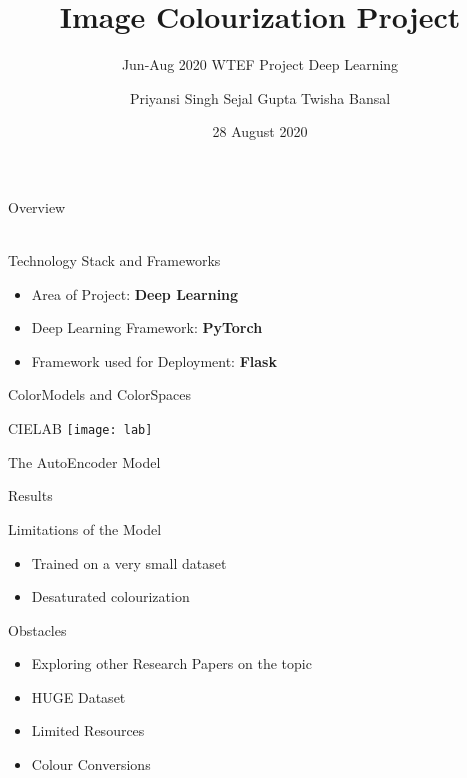 \documentclass[12pt]{beamer}
\title[Image-Colourization]{Image Colourization Project}
\subtitle{Jun-Aug 2020 {\textbar} WTEF Project {\textbar} Deep Learning}
\author[Team-9]{Priyansi Singh {\textbar} Sejal Gupta {\textbar} Twisha Bansal}
\date{28 August 2020}
\begin{document}
\begin{frame}
        \titlepage
\end{frame}

\begin{frame}{Overview}
	\\~
\end{frame}

\begin{frame}{Technology Stack and Frameworks}
	\begin{itemize}
		\item Area of Project: \textbf{Deep Learning}
			\pause
		\item Deep Learning Framework: \textbf{PyTorch}
			\pause
		\item Framework used for Deployment: \textbf{Flask}
	\end{itemize}
\end{frame}

\begin{frame}[standout]
		\pause
\end{frame}

\begin{frame}{ColorModels and ColorSpaces}
\end{frame}

\begin{frame}{CIELAB}
	\texttt{[image: lab]}
\end{frame}

\begin{frame}{The AutoEncoder Model}
\end{frame}

\begin{frame}{Results}
\end{frame}

\begin{frame}{Limitations of the Model}
	\begin{itemize}
		\item Trained on a very small dataset
			\pause
		\item Desaturated colourization
	\end{itemize}
\end{frame}

\begin{frame}{Obstacles}
	\begin{itemize}
		\item Exploring other Research Papers on the topic
			\pause
		\item HUGE Dataset
			\pause
		\item Limited Resources
			\pause
		\item Colour Conversions
	\end{itemize}
\end{frame}

\begin{frame}[standout]
\end{frame}

\begin{frame}[standout]
\end{frame}
\end{document}
